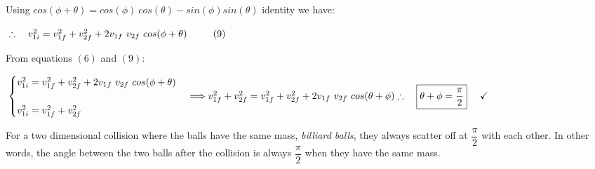 \documentclass[fleqn]{article}
\begin{document}
  Using $\boxed{cos(\phi+\theta)=cos(\phi) ~ cos(\theta)-sin(\phi) sin(\theta)}$ identity we have:

  $
    \\
    \\
    \therefore ~~~ v_{1i}^2=v_{1f}^2+v_{2f}^2+2 v_{1f} ~ v_{2f} ~ cos(\phi+\theta) ~~~~~~~~ (9)
    \\
    \\
  $

  From equations $(6)$ and $(9)$:

  $
    \\
    \begin{cases}
      v_{1i}^2=v_{1f}^2+v_{2f}^2+2 v_{1f} ~ v_{2f} ~ cos(\phi+\theta)
      \\
      \\
      v_{1i}^2=v_{1f}^2+v_{2f}^2
    \end{cases}
    \Longrightarrow
    v_{1f}^2+v_{2f}^2=v_{1f}^2+v_{2f}^2+2 v_{1f} ~ v_{2f} ~ cos(\theta+\phi)
    \\
    \\
    \\
    \therefore ~~~ \boxed{\theta+\phi=\dfrac{\pi}{2}} ~~~~ \checkmark
    \\
    \\
  $

 For a two dimensional collision where the balls have the same mass, \emph{billiard balls}, they always scatter 
 off at $\dfrac{\pi}{2}$ with each other. In other words, the angle between the two balls after the collision is
 always $\dfrac{\pi}{2}$ when they have the same mass.
 
\end{document}
